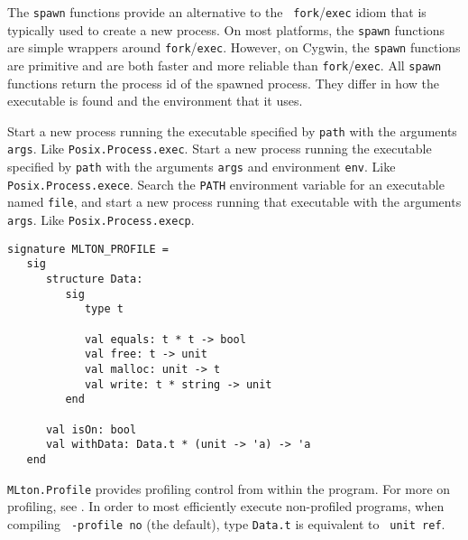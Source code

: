 The {\tt spawn} functions provide an alternative to the {\tt
fork}/{\tt exec} idiom that is typically used to create a new process.
On most platforms, the {\tt spawn} functions are simple wrappers
around {\tt fork}/{\tt exec}.  However, on Cygwin, the {\tt spawn}
functions are primitive and are both faster and more reliable than
{\tt fork}/{\tt exec}.  All {\tt spawn} functions return the process
id of the spawned process.  They differ in how the executable is found
and the environment that it uses.

\begin{description}
Start a new process running the executable specified by {\tt path} with the
arguments {\tt args}.  Like {\tt Posix.Process.exec}.
Start a new process running the executable specified by {\tt path} with the
arguments {\tt args} and environment {\tt env}.  Like {\tt Posix.Process.exece}.
Search the {\tt PATH} environment variable for an executable named {\tt file},
and start a new process running that executable with the arguments {\tt args}.
Like {\tt Posix.Process.execp}.
\end{description}


\begin{verbatim}
signature MLTON_PROFILE =
   sig
      structure Data:
         sig
            type t

            val equals: t * t -> bool
            val free: t -> unit
            val malloc: unit -> t
            val write: t * string -> unit
         end

      val isOn: bool
      val withData: Data.t * (unit -> 'a) -> 'a
   end
\end{verbatim}

{\tt MLton.Profile} provides profiling control from within the
program.  For more on profiling, see .  In order to
most efficiently execute non-profiled programs, when compiling {\tt
-profile no} (the default), type {\tt Data.t} is equivalent to {\tt
unit ref}.


